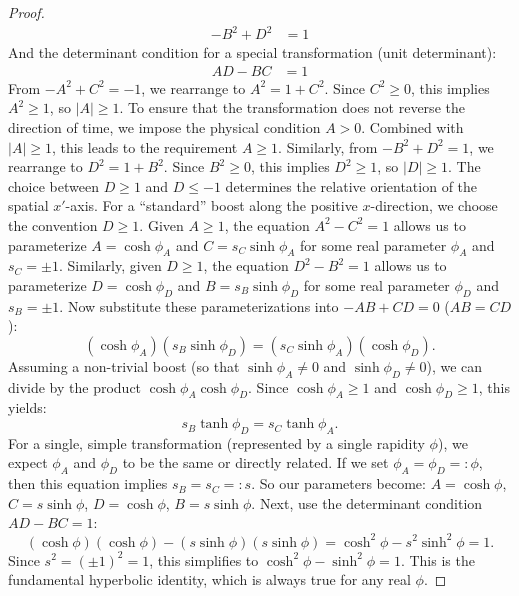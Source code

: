 \documentclass{amsart}
\theoremstyle{definition}
\theoremstyle{remark}
\begin{document}
\begin{proof}
\begin{align*}
    -B^2 + D^2 &= 1
  \end{align*}
  And the determinant condition for a special transformation (unit determinant):
  \begin{align*}
    AD-BC &= 1 
  \end{align*}
  From $-A^2 + C^2 = -1$, we rearrange to $A^2 = 1 + C^2$.
  Since $C^2 \geq 0$, this implies $A^2 \geq 1$, so $|A| \geq 1$.
  To ensure that the transformation does not reverse the direction of time, we impose the physical condition $A > 0$.
  Combined with $|A| \geq 1$, this leads to the requirement $A \geq 1$.
  Similarly, from $-B^2 + D^2 = 1$, we rearrange to $D^2 = 1 + B^2$.
  Since $B^2 \geq 0$, this implies $D^2 \geq 1$, so $|D| \geq 1$.
  The choice between $D \geq 1$ and $D \leq -1$ determines the relative orientation of the spatial $x'$-axis.
  For a ``standard'' boost along the positive $x$-direction, we choose the convention $D \geq 1$.
  Given $A \geq 1$, the equation $A^2 - C^2 = 1$ allows us to parameterize $A = \cosh\phi_A$ and $C = s_C \sinh\phi_A$ for some real parameter $\phi_A$ and $s_C = \pm 1$.
  Similarly, given $D \geq 1$, the equation $D^2 - B^2 = 1$ allows us to parameterize $D = \cosh\phi_D$ and $B = s_B \sinh\phi_D$ for some real parameter $\phi_D$ and $s_B = \pm 1$.
  Now substitute these parameterizations into $-AB + CD = 0$ ($AB = CD$):
  \begin{equation*}
    (\cosh\phi_A)(s_B \sinh\phi_D) = (s_C \sinh\phi_A)(\cosh\phi_D).
  \end{equation*}
  Assuming a non-trivial boost (so that $\sinh\phi_A \neq 0$ and $\sinh\phi_D \neq 0$), we can divide by the product $\cosh\phi_A \cosh\phi_D$.
  Since $\cosh\phi_A \ge 1$ and $\cosh\phi_D \ge 1$, this yields:
  \begin{equation*}
    s_B \tanh\phi_D = s_C \tanh\phi_A.
  \end{equation*}
  For a single, simple transformation (represented by a single rapidity $\phi$), we expect $\phi_A$ and $\phi_D$ to be the same or directly related.
  If we set $\phi_A = \phi_D =: \phi$, then this equation implies $s_B = s_C =: s$.
  So our parameters become: $A = \cosh\phi$, $C = s \sinh\phi$, $D = \cosh\phi$, $B = s \sinh\phi$.
  Next, use the determinant condition $AD-BC=1$:
  \begin{equation*}
    (\cosh\phi)(\cosh\phi) - (s \sinh\phi)(s \sinh\phi) = \cosh^2\phi - s^2 \sinh^2\phi = 1.
  \end{equation*}
  Since $s^2 = (\pm 1)^2 = 1$, this simplifies to $\cosh^2\phi - \sinh^2\phi = 1$.
  This is the fundamental hyperbolic identity, which is always true for any real $\phi$.

\end{proof}
\end{document}
